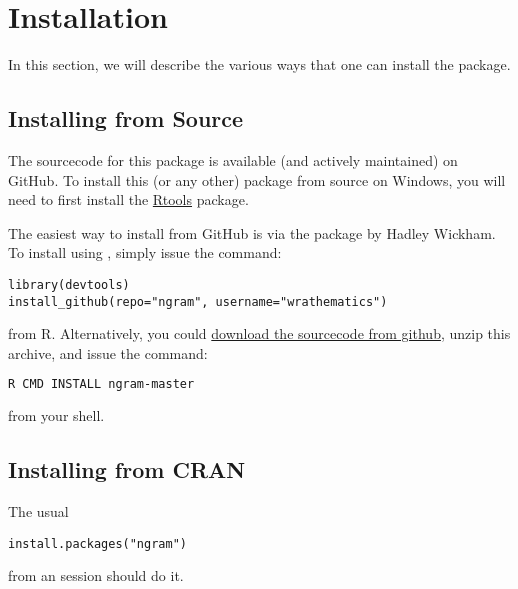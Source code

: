 \section{Installation}
\label{sec:installation}

In this section, we will describe the various ways that one can install the 
\thispackage package.


\subsection{Installing from Source}

The sourcecode for this package is available (and actively maintained) on 
GitHub.  To install this (or any other) package from source on Windows, you will 
need to first install the 
\href{http://cran.r-project.org/bin/windows/Rtools/Rtools216.exe}{Rtools} 
package.

The easiest way to install \thispackage from GitHub is via the 
\href{http://cran.r-project.org/web/packages/devtools/index.html}%
{}
package by Hadley Wickham.  To install \thispackage
using , simply issue the command:
\begin{lstlisting}[language=rr]
library(devtools)
install_github(repo="ngram", username="wrathematics")
\end{lstlisting}
from R.  Alternatively, you could  
\href{https://github.com/wrathematics/ngram/archive/master.zip}%
{download the sourcecode from github}, 
unzip this archive, and issue the command:
\begin{lstlisting}[language=sh]
R CMD INSTALL ngram-master
\end{lstlisting}
from your shell.


\subsection{Installing from CRAN}

The usual
\begin{lstlisting}[language=rr]
install.packages("ngram")
\end{lstlisting}
from an  session should do it.